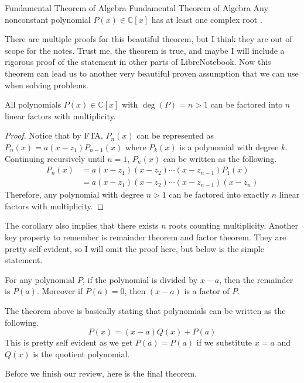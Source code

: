 \documentclass[../../../main.tex]{subfiles}
\begin{document}
\begin{theorem}
{Fundamental Theorem of Algebra}
{Fundamental Theorem of Algebra}
Any nonconstant polynomial $P(x) \in \mathbb{C}[x]$ has at least one
complex root \cite{MATH01-3}.
\end{theorem}

There are multiple proofs for this beautiful theorem, but I think
they are out of scope for the notes. Trust me, the theorem is true,
and maybe I will include a rigorous proof of the statement in other
parts of LibreNotebook. Now this theorem can lead us to another very
beautiful proven assumption that we can use when solving problems.

\begin{corollary}{}{}
All polynomials $P(x) \in \mathbb{C}[x]$ with $\deg(P) = n > 1$
can be factored into $n$ linear factors with multiplicity.
\end{corollary}
\begin{proof}
Notice that by FTA, $P_n(x)$ can be represented as $P_n(x) =
a (x - z_1) P_{n-1}(x)$ where $P_k(x)$ is a polynomial with degree
$k$. Continuing recursively until $n = 1$, $P_n(x)$ can be written as
the following.
\begin{align*}
    P_n(x)
    &= a (x - z_1) (x - z_2) \cdots (x - z_{n-1}) P_1 (x) \\
    &= a (x - z_1) (x - z_2) \cdots (x - z_{n-1}) (x - z_n)
\end{align*}
Therefore, any polynomial with degree $n > 1$ can be factored into
exactly $n$ linear factors with multiplicity.
\end{proof}

The corollary also implies that there exists $n$ roots counting
multiplicity. Another key property to remember is remainder
theorem and factor theorem. They are pretty self-evident, so I
will omit the proof here, but below is the simple statement.

\begin{theorem}{}{}
For any polynomial $P$, if the polynomial is divided by $x - a$,
then the remainder is $P(a)$. Moreover if $P(a) = 0$, then $(x - a)$
is a factor of $P$.
\end{theorem}

The theorem above is basically stating that polynomials can be written
as the following.
\[
P(x) = (x - a) Q(x) + P(a)
\]
This is pretty self evident as we get $P(a) = P(a)$ if we substitute
$x = a$ and $Q(x)$ is the quotient polynomial.

Before we finish our review, here is the final theorem.
\end{document}
